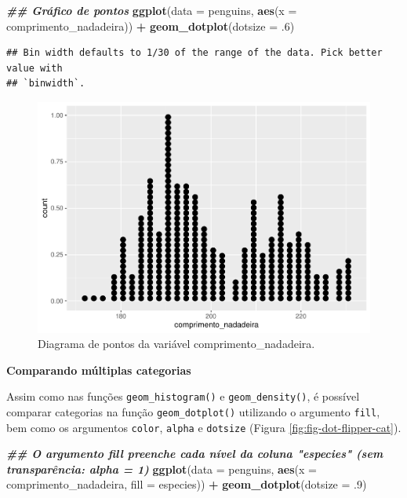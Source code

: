 \documentclass[
]{article}
\newenvironment{Shaded}{\begin{snugshade}}{\end{snugshade}}
\newcommand{\AttributeTok}[1]{\textcolor[rgb]{0.13,0.29,0.53}{#1}}
\newcommand{\DecValTok}[1]{\textcolor[rgb]{0.00,0.00,0.81}{#1}}
\newcommand{\DocumentationTok}[1]{\textcolor[rgb]{0.56,0.35,0.01}{\textbf{\textit{#1}}}}
\newcommand{\FunctionTok}[1]{\textcolor[rgb]{0.13,0.29,0.53}{\textbf{#1}}}
\newcommand{\NormalTok}[1]{#1}
\newcommand{\SpecialCharTok}[1]{\textcolor[rgb]{0.81,0.36,0.00}{\textbf{#1}}}
\begin{document}
\begin{Shaded}
\begin{Highlighting}[]
\DocumentationTok{\#\# Gráfico de pontos}
\FunctionTok{ggplot}\NormalTok{(}\AttributeTok{data =}\NormalTok{ penguins, }
       \FunctionTok{aes}\NormalTok{(}\AttributeTok{x =}\NormalTok{ comprimento\_nadadeira)) }\SpecialCharTok{+}
    \FunctionTok{geom\_dotplot}\NormalTok{(}\AttributeTok{dotsize =}\NormalTok{ .}\DecValTok{6}\NormalTok{)}
\end{Highlighting}
\end{Shaded}

\begin{verbatim}
## Bin width defaults to 1/30 of the range of the data. Pick better value with
## `binwidth`.
\end{verbatim}

\begin{figure}
\includegraphics[width=0.75\linewidth,height=0.75\textheight]{epr_files/figure-latex/fig-dot-flipper-1} \caption{Diagrama de pontos da variável comprimento_nadadeira.}\label{fig:fig-dot-flipper}
\end{figure}

\textbf{Comparando múltiplas categorias}

Assim como nas funções \texttt{geom\_histogram()} e \texttt{geom\_density()}, é possível comparar categorias na função \texttt{geom\_dotplot()} utilizando o argumento \texttt{fill}, bem como os argumentos \texttt{color}, \texttt{alpha} e \texttt{dotsize} (Figura \ref{fig:fig-dot-flipper-cat}).

\begin{Shaded}
\begin{Highlighting}[]
\DocumentationTok{\#\# O argumento fill preenche cada nível da coluna "especies" (sem transparência: alpha = 1)}
\FunctionTok{ggplot}\NormalTok{(}\AttributeTok{data =}\NormalTok{ penguins, }
       \FunctionTok{aes}\NormalTok{(}\AttributeTok{x =}\NormalTok{ comprimento\_nadadeira, }\AttributeTok{fill =}\NormalTok{ especies)) }\SpecialCharTok{+}
    \FunctionTok{geom\_dotplot}\NormalTok{(}\AttributeTok{dotsize =}\NormalTok{ .}\DecValTok{9}\NormalTok{)}
\end{Highlighting}
\end{Shaded}
\end{document}
